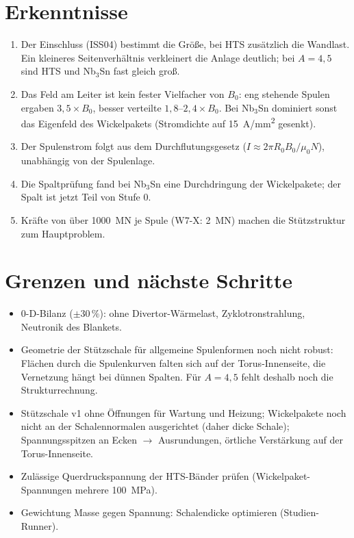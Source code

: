 \documentclass[10pt,a4paper]{article}
\begin{document}
\section{Erkenntnisse}
\begin{enumerate}
\item Der Einschluss (ISS04) bestimmt die Größe, bei HTS zusätzlich die Wandlast. Ein kleineres Seitenverhältnis
  verkleinert die Anlage deutlich; bei $A=4{,}5$ sind HTS und Nb$_3$Sn fast gleich groß.
\item Das Feld am Leiter ist kein fester Vielfacher von $B_0$: eng stehende Spulen ergaben $3{,}5\times B_0$,
  besser verteilte $1{,}8$--$2{,}4\times B_0$. Bei Nb$_3$Sn dominiert sonst das Eigenfeld des Wickelpakets
  (Stromdichte auf \SI{15}{A/mm^2} gesenkt).
\item Der Spulenstrom folgt aus dem Durchflutungsgesetz ($I\approx2\pi R_0B_0/\mu_0N$), unabhängig von der Spulenlage.
\item Die Spaltprüfung fand bei Nb$_3$Sn eine Durchdringung der Wickelpakete; der Spalt ist jetzt Teil von Stufe 0.
\item Kräfte von über \SI{1000}{MN} je Spule (W7-X: \SI{2}{MN}) machen die Stützstruktur zum Hauptproblem.
\end{enumerate}

\section{Grenzen und nächste Schritte}
\begin{itemize}
\item 0-D-Bilanz ($\pm30\,\%$): ohne Divertor-Wärmelast, Zyklotronstrahlung, Neutronik des Blankets.
\item Geometrie der Stützschale für allgemeine Spulenformen noch nicht robust: Flächen durch die
  Spulenkurven falten sich auf der Torus-Innenseite, die Vernetzung hängt bei dünnen Spalten.
  Für $A=4{,}5$ fehlt deshalb noch die Strukturrechnung.
\item Stützschale v1 ohne Öffnungen für Wartung und Heizung; Wickelpakete noch nicht an der Schalennormalen ausgerichtet
  (daher dicke Schale); Spannungsspitzen an Ecken $\to$ Ausrundungen, örtliche Verstärkung auf der Torus-Innenseite.
\item Zulässige Querdruckspannung der HTS-Bänder prüfen (Wickelpaket-Spannungen mehrere \SI{100}{MPa}).
\item Gewichtung Masse gegen Spannung: Schalendicke optimieren (Studien-Runner).
\end{itemize}
\end{document}
